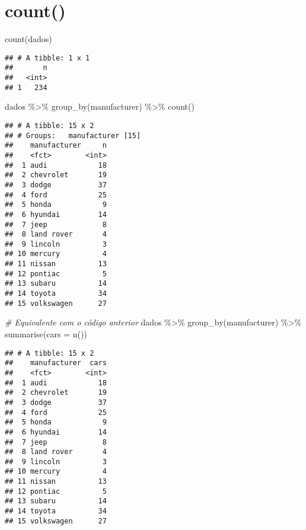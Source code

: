 \documentclass[
]{book}
\newenvironment{Shaded}{\begin{snugshade}}{\end{snugshade}}
\newcommand{\AttributeTok}[1]{\textcolor[rgb]{0.77,0.63,0.00}{#1}}
\newcommand{\CommentTok}[1]{\textcolor[rgb]{0.56,0.35,0.01}{\textit{#1}}}
\newcommand{\FunctionTok}[1]{\textcolor[rgb]{0.00,0.00,0.00}{#1}}
\newcommand{\NormalTok}[1]{#1}
\newcommand{\SpecialCharTok}[1]{\textcolor[rgb]{0.00,0.00,0.00}{#1}}
\begin{document}
\hypertarget{count}{%
\section{count()}\label{count}}

\begin{Shaded}
\begin{Highlighting}[]
\FunctionTok{count}\NormalTok{(dados)}
\end{Highlighting}
\end{Shaded}

\begin{verbatim}
## # A tibble: 1 x 1
##       n
##   <int>
## 1   234
\end{verbatim}

\begin{Shaded}
\begin{Highlighting}[]
\NormalTok{dados }\SpecialCharTok{\%\textgreater{}\%} 
  \FunctionTok{group\_by}\NormalTok{(manufacturer) }\SpecialCharTok{\%\textgreater{}\%}
  \FunctionTok{count}\NormalTok{()}
\end{Highlighting}
\end{Shaded}

\begin{verbatim}
## # A tibble: 15 x 2
## # Groups:   manufacturer [15]
##    manufacturer     n
##    <fct>        <int>
##  1 audi            18
##  2 chevrolet       19
##  3 dodge           37
##  4 ford            25
##  5 honda            9
##  6 hyundai         14
##  7 jeep             8
##  8 land rover       4
##  9 lincoln          3
## 10 mercury          4
## 11 nissan          13
## 12 pontiac          5
## 13 subaru          14
## 14 toyota          34
## 15 volkswagen      27
\end{verbatim}

\begin{Shaded}
\begin{Highlighting}[]
\CommentTok{\# Equivalente com o código anterior}
\NormalTok{dados }\SpecialCharTok{\%\textgreater{}\%} 
  \FunctionTok{group\_by}\NormalTok{(manufacturer) }\SpecialCharTok{\%\textgreater{}\%}
  \FunctionTok{summarise}\NormalTok{(}\AttributeTok{cars =} \FunctionTok{n}\NormalTok{())}
\end{Highlighting}
\end{Shaded}

\begin{verbatim}
## # A tibble: 15 x 2
##    manufacturer  cars
##    <fct>        <int>
##  1 audi            18
##  2 chevrolet       19
##  3 dodge           37
##  4 ford            25
##  5 honda            9
##  6 hyundai         14
##  7 jeep             8
##  8 land rover       4
##  9 lincoln          3
## 10 mercury          4
## 11 nissan          13
## 12 pontiac          5
## 13 subaru          14
## 14 toyota          34
## 15 volkswagen      27
\end{verbatim}
\end{document}

